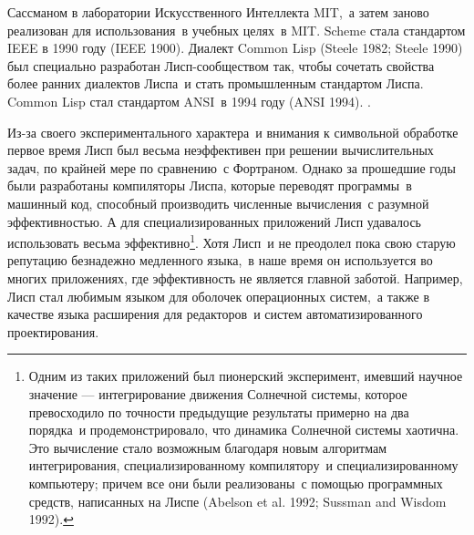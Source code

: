 {Сассманом
в лаборатории Искусственного Интеллекта MIT,~а затем заново реализован
для использования~в учебных целях~в MIT. Scheme стала стандартом IEEE
в 1990 году (IEEE 1900).  Диалект  
Common Lisp (Steele 1982; Steele 1990)
был специально разработан Лисп-сообществом так, чтобы сочетать свойства более
ранних диалектов Лиспа~и стать промышленным стандартом Лиспа. Common
Lisp стал стандартом ANSI~в 1994 году (ANSI 1994).
}.

Из-за своего экспериментального характера~и внимания к
символьной обработке первое время Лисп был весьма неэффективен при решении вычислительных задач, по крайней мере по сравнению~с 
 Фортраном.
Однако за прошедшие годы были разработаны компиляторы Лиспа, которые
переводят программы~в машинный код, способный производить численные
вычисления~с разумной эффективностью. А для специализированных
приложений Лисп удавалось использовать весьма эффективно\footnote{Одним из таких приложений был пионерский эксперимент,
имевший научное значение --- интегрирование движения Солнечной системы,
которое превосходило по точности предыдущие результаты примерно на два 
порядка~и продемонстрировало, что 
динамика Солнечной системы хаотична.
Это вычисление стало возможным благодаря новым алгоритмам
интегрирования, специализированному компилятору~и специализированному
компьютеру; причем все они были реализованы~с помощью программных
средств, написанных на Лиспе (Abelson et al. 1992;
Sussman and Wisdom 1992).
}.
Хотя Лисп~и не преодолел пока свою старую репутацию безнадежно
медленного языка,~в наше время он используется во многих
приложениях, где эффективность не является главной заботой.  Например, 
Лисп стал любимым языком для оболочек операционных систем,~а также в
качестве языка расширения для редакторов~и систем автоматизированного
проектирования\-.

